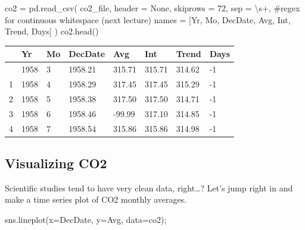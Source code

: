 \documentclass[
  letterpaper,
  DIV=11,
  numbers=noendperiod]{scrreprt}
\newenvironment{Shaded}{\begin{snugshade}}{\end{snugshade}}
\newcommand{\CommentTok}[1]{\textcolor[rgb]{0.37,0.37,0.37}{#1}}
\newcommand{\DecValTok}[1]{\textcolor[rgb]{0.68,0.00,0.00}{#1}}
\newcommand{\NormalTok}[1]{\textcolor[rgb]{0.00,0.23,0.31}{#1}}
\newcommand{\OperatorTok}[1]{\textcolor[rgb]{0.37,0.37,0.37}{#1}}
\newcommand{\StringTok}[1]{\textcolor[rgb]{0.13,0.47,0.30}{#1}}
\newcommand{\VariableTok}[1]{\textcolor[rgb]{0.07,0.07,0.07}{#1}}
\begin{document}
\begin{Shaded}
\begin{Highlighting}[]
\NormalTok{co2 }\OperatorTok{=}\NormalTok{ pd.read\_csv(}
\NormalTok{    co2\_file, header }\OperatorTok{=} \VariableTok{None}\NormalTok{, skiprows }\OperatorTok{=} \DecValTok{72}\NormalTok{,}
\NormalTok{    sep }\OperatorTok{=} \StringTok{\textquotesingle{}\textbackslash{}s+\textquotesingle{}}\NormalTok{, }\CommentTok{\#regex for continuous whitespace (next lecture)}
\NormalTok{    names }\OperatorTok{=}\NormalTok{ [}\StringTok{\textquotesingle{}Yr\textquotesingle{}}\NormalTok{, }\StringTok{\textquotesingle{}Mo\textquotesingle{}}\NormalTok{, }\StringTok{\textquotesingle{}DecDate\textquotesingle{}}\NormalTok{, }\StringTok{\textquotesingle{}Avg\textquotesingle{}}\NormalTok{, }\StringTok{\textquotesingle{}Int\textquotesingle{}}\NormalTok{, }\StringTok{\textquotesingle{}Trend\textquotesingle{}}\NormalTok{, }\StringTok{\textquotesingle{}Days\textquotesingle{}}\NormalTok{]}
\NormalTok{)}
\NormalTok{co2.head()}
\end{Highlighting}
\end{Shaded}

\begin{longtable}[]{@{}llllllll@{}}
\toprule\noalign{}
& Yr & Mo & DecDate & Avg & Int & Trend & Days \\
\midrule\noalign{}
\endhead
\bottomrule\noalign{}
\endlastfoot
0 & 1958 & 3 & 1958.21 & 315.71 & 315.71 & 314.62 & -1 \\
1 & 1958 & 4 & 1958.29 & 317.45 & 317.45 & 315.29 & -1 \\
2 & 1958 & 5 & 1958.38 & 317.50 & 317.50 & 314.71 & -1 \\
3 & 1958 & 6 & 1958.46 & -99.99 & 317.10 & 314.85 & -1 \\
4 & 1958 & 7 & 1958.54 & 315.86 & 315.86 & 314.98 & -1 \\
\end{longtable}

\subsection{Visualizing CO2}\label{visualizing-co2}

Scientific studies tend to have very clean data, right\ldots? Let's jump
right in and make a time series plot of CO2 monthly averages.

\begin{Shaded}
\begin{Highlighting}[]
\NormalTok{sns.lineplot(x}\OperatorTok{=}\StringTok{\textquotesingle{}DecDate\textquotesingle{}}\NormalTok{, y}\OperatorTok{=}\StringTok{\textquotesingle{}Avg\textquotesingle{}}\NormalTok{, data}\OperatorTok{=}\NormalTok{co2)}\OperatorTok{;}
\end{Highlighting}
\end{Shaded}
\end{document}
